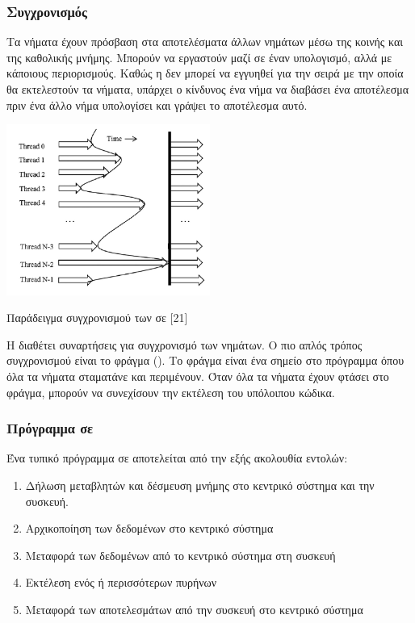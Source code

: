 \subsubsection{Συγχρονισμός}

Τα νήματα έχουν πρόσβαση στα αποτελέσματα άλλων νημάτων μέσω της κοινής και της καθολικής μνήμης. Μπορούν να εργαστούν μαζί σε έναν υπολογισμό, αλλά με κάποιους περιορισμούς. Καθώς η  δεν μπορεί να εγγυηθεί για την σειρά με την οποία θα εκτελεστούν τα νήματα, υπάρχει ο κίνδυνος ένα νήμα να διαβάσει ένα αποτέλεσμα πριν ένα άλλο νήμα υπολογίσει και γράψει το αποτέλεσμα αυτό.
 
\begin{Illustration}[!h] 
	\centering
	\includegraphics[width=0.5\textwidth]{images/image052.png} 
	\caption{Παράδειγμα συγχρονισμού των  σε  [21]}
	\label{image-3.9}
\end{Illustration}


Η  διαθέτει συναρτήσεις για συγχρονισμό των νημάτων. Ο πιο απλός τρόπος συγχρονισμού είναι το φράγμα (). Το φράγμα είναι ένα σημείο στο πρόγραμμα όπου όλα τα νήματα σταματάνε και περιμένουν. Όταν όλα τα νήματα έχουν φτάσει στο φράγμα, μπορούν να συνεχίσουν την εκτέλεση του υπόλοιπου κώδικα.

\subsubsection{Πρόγραμμα σε }
Ένα τυπικό πρόγραμμα σε  αποτελείται από την εξής ακολουθία εντολών:
\begin{enumerate}
\item Δήλωση μεταβλητών και δέσμευση μνήμης στο κεντρικό σύστημα και την συσκευή.
\item Αρχικοποίηση των δεδομένων στο κεντρικό σύστημα
\item Μεταφορά των δεδομένων από το κεντρικό σύστημα στη συσκευή
\item Εκτέλεση ενός ή περισσότερων πυρήνων
\item Μεταφορά των αποτελεσμάτων από την συσκευή στο κεντρικό σύστημα
\end{enumerate}

